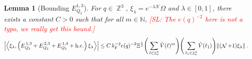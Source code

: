 \documentclass[12pt,a4paper]{article}
\numberwithin{equation}{section}
\newcommand{\cK}{\mathcal{K}}
\newcommand{\NNN}{\mathbb{N}}
\newcommand{\1}{\mathbb{I}}
\newcommand{\F}{\mathrm{F}}
\DeclareMathOperator{\Z}{\mathbb{Z}}
\DeclareMathOperator{\NN}{\mathcal{N}}
\newcommand{\half}{\frac{1}{2}}
\newcommand{\eva}[1]{\left\langle #1 \right\rangle}
\theoremstyle{plain}
\newtheorem{lemma}[theorem]{Lemma}
\theoremstyle{definition}
\theoremstyle{remark}
\theoremstyle{plain}
\theoremstyle{definition}
\theoremstyle{remark}
\begin{document}
\begin{lemma}[Bounding $E_{Q_2}^{1,3}$]\label{lem:EQ213}
For $ q \in \Z^3 $, $\xi_\lambda = e^{-\lambda \cK} \Omega$ and $ \lambda \in [0,1] $, there exists a constant $ C > 0 $ such that for all $ m \in \NNN $, \textcolor{red}{[SL: The $ e(q)^{-2} $ here is not a typo, we really get this bound.]}
\begin{equation}
	\abs{\eva{\xi_\lambda,\left(E^{\,1,3}_{Q_2}+E^{\,2,3}_{Q_2}+E^{\,1,4}_{Q_2}+\mathrm{h.c.}\right) \xi_\lambda }} 
	\leq  C\, k_{\F}^{-2} e(q)^{-2} \Xi^{\half}
		\Bigg(\sum\limits_{\ell \in \Z^3_*} \hat{V}(\ell)^m \Bigg)
		\Bigg( \sum\limits_{\ell_1 \in \Z^3_*}\hat{V}(\ell_1) \Bigg)
		\norm { (\NN+1) \xi_\lambda } \;.\label{eq:estEQ213}
\end{equation}
\end{lemma}
\end{document}
